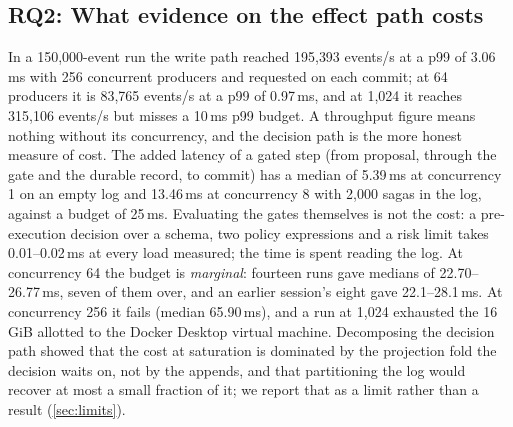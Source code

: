 \subsection{RQ2: What evidence on the effect path costs}
\label{sec:eval-latency}
In a 150{,}000-event run the write path reached 195{,}393 events/s at a p99 of
3.06\,ms with 256 concurrent producers and  requested on each commit; at 64 producers it is
83{,}765 events/s at a p99 of 0.97\,ms, and at 1{,}024 it reaches 315{,}106
events/s but misses a 10\,ms p99 budget.
A throughput figure means nothing without its concurrency, and the decision path
is the more honest measure of cost. The added latency of a gated step (from
proposal, through the gate and the durable record, to commit) has a median of
5.39\,ms at concurrency 1 on an empty log and 13.46\,ms at concurrency 8 with
2{,}000 sagas in the log, against a budget of 25\,ms.
Evaluating the gates themselves is not the cost: a pre-execution decision over a
schema, two policy expressions and a risk limit takes 0.01--0.02\,ms at every
load measured; the time is spent reading the log.
At concurrency 64 the budget is \emph{marginal}: fourteen runs gave medians of
22.70--26.77\,ms, seven of them over, and an earlier session's eight gave
22.1--28.1\,ms. At concurrency 256 it fails (median
65.90\,ms), and a run at 1{,}024 exhausted the 16\,GiB allotted to the Docker
Desktop virtual machine.
Decomposing the decision path showed that the cost at saturation is dominated by
the projection fold the decision waits on, not by the appends, and that
partitioning the log would recover at most a small fraction of it; we report that
as a limit rather than a result (\cref{sec:limits}).


